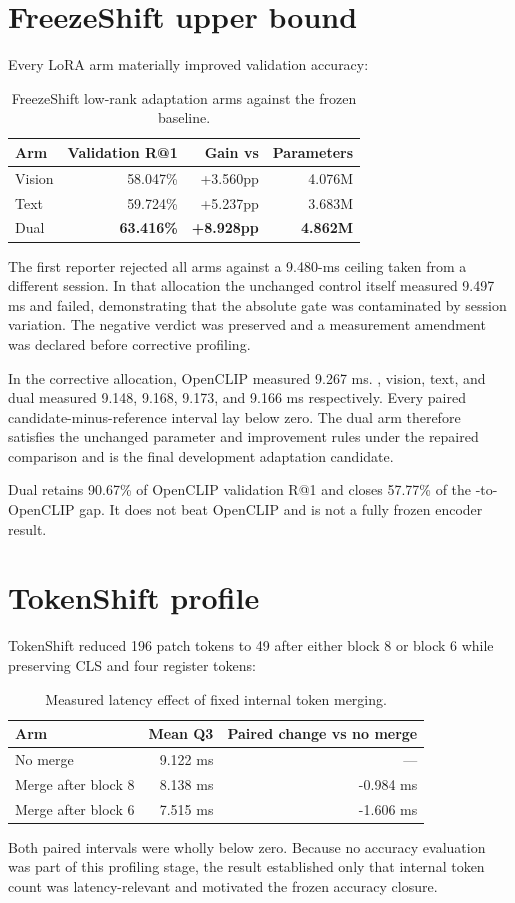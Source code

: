 \section{FreezeShift upper bound}
Every LoRA arm materially improved validation accuracy:

\begin{table}[htbp]
\centering
\caption{FreezeShift low-rank adaptation arms against the frozen \MTone{} baseline.}
\label{tab:freezeshift}
\begin{tabular}{L{4.5cm}rrr}
\toprule
Arm & Validation R@1 & Gain vs \MTone{} & Parameters \\
\midrule
Vision & 58.047\% & +3.560pp & 4.076M \\
Text & 59.724\% & +5.237pp & 3.683M \\
Dual & \textbf{63.416\%} & \textbf{+8.928pp} & \textbf{4.862M} \\
\bottomrule
\end{tabular}
\end{table}
The first reporter rejected all arms against a 9.480-ms ceiling taken from a different session. In that allocation the unchanged \MTone{} control itself measured 9.497 ms and failed, demonstrating that the absolute gate was contaminated by session variation. The negative verdict was preserved and a measurement amendment was declared before corrective profiling.

In the corrective allocation, OpenCLIP measured 9.267 ms. \MTone{}, vision, text, and dual measured 9.148, 9.168, 9.173, and 9.166 ms respectively. Every paired candidate-minus-reference interval lay below zero. The dual arm therefore satisfies the unchanged parameter and improvement rules under the repaired comparison and is the final development adaptation candidate.

Dual retains 90.67\% of OpenCLIP validation R@1 and closes 57.77\% of the \MTone{}-to-OpenCLIP gap. It does not beat OpenCLIP and is not a fully frozen encoder result.

\section{TokenShift profile}
TokenShift reduced 196 patch tokens to 49 after either block 8 or block 6 while preserving CLS and four register tokens:

\begin{table}[htbp]
\centering
\caption{Measured latency effect of fixed internal token merging.}
\label{tab:tokenshift-latency}
\begin{tabular}{L{5.5cm}rr}
\toprule
Arm & Mean Q3 & Paired change vs no merge \\
\midrule
No merge & 9.122 ms & --- \\
Merge after block 8 & 8.138 ms & -0.984 ms \\
Merge after block 6 & 7.515 ms & -1.606 ms \\
\bottomrule
\end{tabular}
\end{table}
Both paired intervals were wholly below zero. Because no accuracy evaluation was part of this profiling stage, the result established only that internal token count was latency-relevant and motivated the frozen accuracy closure.

